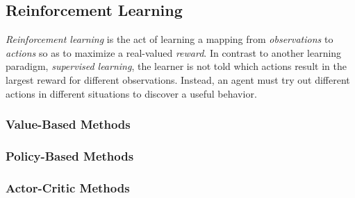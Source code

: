 \subsection{Reinforcement Learning}
\textit{Reinforcement learning} is the act of learning a mapping from \textit{observations} to \textit{actions} so as to maximize a real-valued \textit{reward}. In contrast to another learning paradigm, \textit{supervised learning}, the learner is not told which actions result in the largest reward for different observations. Instead, an agent must try out different actions in different situations to discover a useful behavior. \cite{sutton}


\subsubsection{Value-Based Methods}
\subsubsection{Policy-Based Methods}
\subsubsection{Actor-Critic Methods}